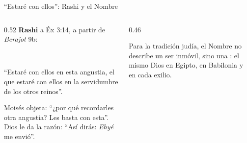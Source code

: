 \begin{frame}{``Estaré con ellos'': Rashi y el Nombre}
\begin{columns}[t,onlytextwidth]
\begin{column}{0.52\textwidth}\small
\textbf{Rashi} a Éx 3:14, a partir de \emph{Berajot} 9b:
\begin{center}\\ \end{center}
``Estaré con ellos en esta angustia, el que estaré con ellos en la servidumbre de los otros reinos''.\par\smallskip
Moisés objeta: ``¿por qué recordarles otra angustia? Les basta con esta''. Dios le da la razón: ``Así dirás: \emph{Ehyé} me envió''.
\end{column}
\begin{column}{0.46\textwidth}
\begin{tcolorbox}[colback=papiro,colframe=dorado,boxrule=1.2pt,arc=3pt]
\small Para la tradición judía, el Nombre no describe un ser inmóvil, sino una : el mismo Dios en Egipto, en Babilonia y en cada exilio.
\end{tcolorbox}
\end{column}
\end{columns}
\end{frame}

